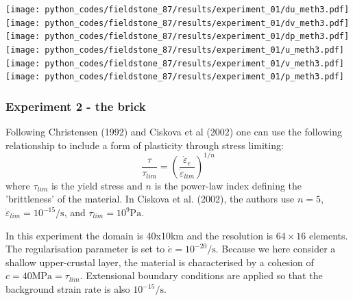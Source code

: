 \begin{center}
\texttt{[image: python\_codes/fieldstone\_87/results/experiment\_01/du\_meth3.pdf]}
\texttt{[image: python\_codes/fieldstone\_87/results/experiment\_01/dv\_meth3.pdf]}
\texttt{[image: python\_codes/fieldstone\_87/results/experiment\_01/dp\_meth3.pdf]}\\
\texttt{[image: python\_codes/fieldstone\_87/results/experiment\_01/u\_meth3.pdf]}
\texttt{[image: python\_codes/fieldstone\_87/results/experiment\_01/v\_meth3.pdf]}
\texttt{[image: python\_codes/fieldstone\_87/results/experiment\_01/p\_meth3.pdf]}
\end{center}




\newpage
\subsubsection*{Experiment 2 - the brick }

Following Christensen (1992) \cite{chri92} and Ciskova et al (2002) \cite{civv02} 
one can use the following relationship to include a form of plasticity through stress limiting:
\[
\frac{\tau}{\tau_{lim}} = \left( \frac{ \dot{\varepsilon}_e  }{ \dot{\varepsilon}_{lim}  }  \right)^{1/n}
\]
where $\tau_{lim}$ is the yield stress and $n$ is the power-law index defining the 'brittleness'
of the material. In Ciskova et al. (2002), 
the authors use $n=5$, $\dot{\varepsilon}_{lim}=10^{-15}\si{\per\second}$, 
and $\tau_{lim}=10^{9}\si{\pascal}$. 

In this experiment the domain is 40x10\si{\kilo\metre} and the resolution is $64\times 16$ elements. 
The regularisation parameter is set to $\dot{e}=10^{-20}\si{\per\second}$.
Because we here consider a shallow upper-crustal 
layer, the material is characterised by a cohesion of $c=40\si{\mega\pascal}=\tau_{lim}$.
Extensional boundary conditions are applied so that the background strain rate is 
also $10^{-15}\si{\per\second}$.

